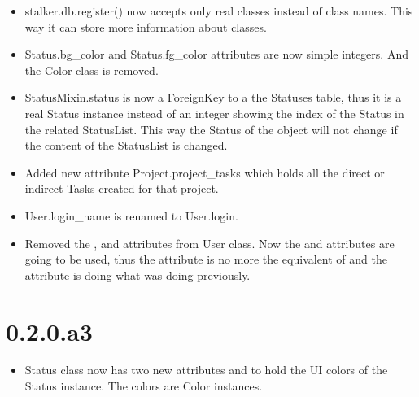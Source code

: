 \documentclass[a4paper,10pt,english]{sphinxmanual}
\def\PYGZob{\char`\{}
\def\PYGZcb{\char`\}}
\begin{document}
\begin{itemize}
\begin{Verbatim}[commandchars=\\\{\}]
\# and now define a FilenameTemplate for placing Asset Reference files.
\# no need to have an output\_path here...
f\_ref = FilenameTemplate(
    target\_entity\_type="Asset",
    type=ref\_type,
    path="Assets/\PYGZob{}\PYGZob{}asset.type.code\PYGZcb{}\PYGZcb{}/\PYGZob{}\PYGZob{}asset.code\PYGZcb{}\PYGZcb{}/References",
    filename="\PYGZob{}\PYGZob{}link.type.code\PYGZcb{}\PYGZcb{}/\PYGZob{}\PYGZob{}link.id\PYGZcb{}\PYGZcb{}\PYGZob{}\PYGZob{}link.extension\PYGZcb{}\PYGZcb{}"
)
\end{Verbatim}

\item {} 
stalker.db.register() now accepts only real classes instead of class names.
This way it can store more information about classes.

\item {} 
Status.bg\_color and Status.fg\_color attributes are now simple integers. And
the Color class is removed.

\item {} 
StatusMixin.status is now a ForeignKey to a the Statuses table, thus it is a
real Status instance instead of an integer showing the index of the Status in
the related StatusList. This way the Status of the object will not change if
the content of the StatusList is changed.

\item {} 
Added new attribute Project.project\_tasks which holds all the direct or
indirect Tasks created for that project.

\item {} 
User.login\_name is renamed to User.login.

\item {} 
Removed the ,  and  attributes from
User class. Now the  and  attributes are going to be used,
thus the  attribute is no more the equivalent of  and the
 attribute is doing what was  doing previously.

\end{itemize}


\section{0.2.0.a3}
\label{changelog:a3}\begin{itemize}
\item {} 
Status class now has two new attributes  and  to hold
the UI colors of the Status instance. The colors are Color instances.

\end{itemize}
\end{document}
